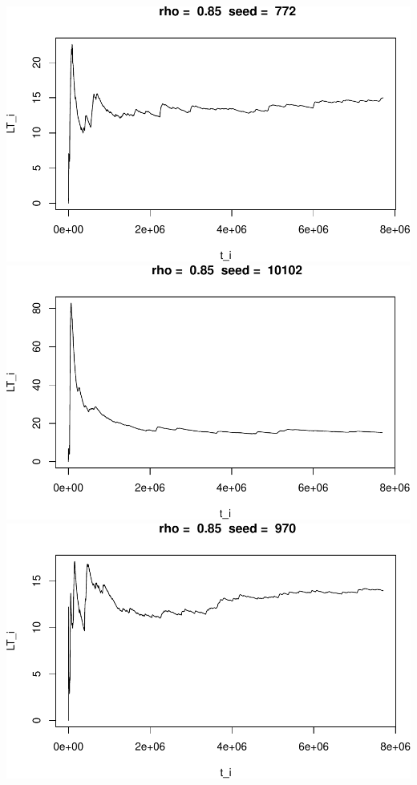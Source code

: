 \documentclass[]{article}
\begin{document}
\includegraphics{003_files/figure-latex/unnamed-chunk-21-1.pdf}
\includegraphics{003_files/figure-latex/unnamed-chunk-21-2.pdf}
\includegraphics{003_files/figure-latex/unnamed-chunk-21-3.pdf}
\end{document}

